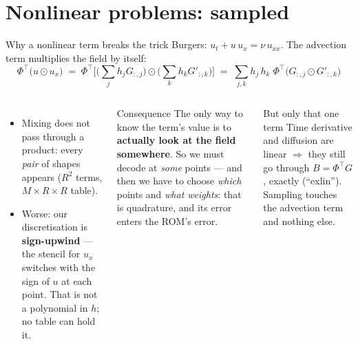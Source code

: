 \documentclass[10pt,aspectratio=169]{beamer}
\newcommand{\T}{^{\top}}
\begin{document}
\section{Nonlinear problems: sampled}
\begin{frame}{Why a nonlinear term breaks the trick}
  Burgers: $u_t + u\,u_x = \nu\,u_{xx}$. The advection term multiplies the field by itself:
  \[
    \Phi\T\big(u\odot u_x\big)
    \;=\; \Phi\T\Big[\Big(\sum_j h_j G_{:,j}\Big)\odot\Big(\sum_k h_k G'_{:,k}\Big)\Big]
    \;=\; \sum_{j,k} h_j\,h_k\;\Phi\T\big(G_{:,j}\odot G'_{:,k}\big)
  \]
  \footnotesize
  \begin{columns}[T]
    \begin{itemize}
      \item Mixing does not pass through a product: every \emph{pair} of shapes appears ($R^2$ terms, $M\times R\times R$ table).
      \item Worse: our discretisation is \textbf{sign-upwind} --- the stencil for $u_x$ switches with the sign of $u$ at each point. That is not a polynomial in $h$; no table can hold it.
    \end{itemize}
    \begin{alertblock}{Consequence}
      The only way to know the term's value is to \textbf{actually look at the field somewhere}.
      So we must decode at \emph{some} points --- and then we have to choose \emph{which} points and \emph{what weights}: that is quadrature, and its error enters the ROM's error.
    \end{alertblock}
    \begin{block}{But only that one term}
      Time derivative and diffusion are linear $\Rightarrow$ they still go through $B=\Phi\T G$, exactly (``exlin''). Sampling touches the advection term and nothing else.
    \end{block}
  \end{columns}
\end{frame}
\end{document}
